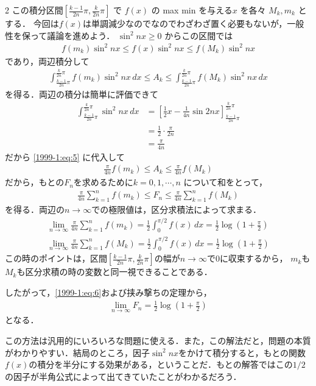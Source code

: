 \documentclass[../../main.tex]{subfiles}
\begin{document}
\begin{multicols}{2}
  この積分区間$\left[ \frac{k-1}{2n}\pi, \frac{k}{2n}\pi \right]$ で $f(x)$ の max min を与える$x$ を各々 $M_k, m_k$ とする．
  今回は$f(x)$は単調減少なのでなのでわざわざ置く必要もないが，一般性を保って議論を進めよう．
  $\sin^2 nx \ge 0$ からこの区間では
  \begin{align*}
    f(m_k) \sin^2 nx \le f(x) \sin^2 nx \le f(M_k) \sin^2 nx
  \end{align*}
  であり，両辺積分して
  \begin{align}
    \int_{\frac{k-1}{2n}\pi}^{\frac{k}{2n}\pi} f(m_k) \sin^2 nx \, dx
    \le A_k
    \le \int_{\frac{k-1}{2n}\pi}^{\frac{k}{2n}\pi} f(M_k) \sin^2 nx \, dx \label{1999-1:eq:5}
  \end{align}
  を得る．両辺の積分は簡単に評価できて
  \begin{align*}
    \int_{\frac{k-1}{2n}\pi}^{\frac{k}{2n}\pi} \sin^2 nx \, dx
     & = \left[ \frac{1}{2}x - \frac{1}{4n}\sin 2nx \right]_{\frac{k-1}{2n}\pi}^{\frac{k}{2n}\pi} \\
     & = \frac{1}{2} \cdot \frac{\pi}{2n}                                                         \\
     & = \frac{\pi}{4n}
  \end{align*}
  だから \cref{1999-1:eq:5} に代入して
  \begin{align*}
    \frac{\pi}{4n} f(m_k) \le A_k \le \frac{\pi}{4n} f(M_k)
  \end{align*}
  だから，もとの$F_n$を求めるために$k=0,1,\cdots,n$ について和をとって，
  \begin{align}
    \frac{\pi}{4n} \sum_{k=1}^{n} f(m_k)
    \le F_n
    \le \frac{\pi}{4n} \sum_{k=1}^{n} f(M_k) \label{1999-1:eq:6}
  \end{align}
  を得る．両辺の$n\to\infty$での極限値は，区分求積法によって求まる．
  \begin{align*}
    \lim_{n\to\infty}\frac{\pi}{4n} \sum_{k=1}^{n} f(m_k) = \frac{1}{2} \int_0^{\pi/2} f(x) \, dx = \frac{1}{2} \log \left(1+\frac{\pi}{2}\right) \\
    \lim_{n\to\infty}\frac{\pi}{4n} \sum_{k=1}^{n} f(M_k) = \frac{1}{2} \int_0^{\pi/2} f(x) \, dx =  \frac{1}{2} \log \left(1+\frac{\pi}{2}\right)
  \end{align*}
  この時のポイントは，区間$\left[ \frac{k-1}{2n}\pi, \frac{k}{2n}\pi \right]$の幅が$n\to\infty$で$0$に収束するから，
  $m_k$も$M_k$も区分求積の時の変数と同一視できることである．

  したがって，\cref{1999-1:eq:6}および挟み撃ちの定理から，
  \begin{align*}
    \lim_{n\to\infty} F_n = \frac{1}{2}\log \left(1+\frac{\pi}{2}\right)
  \end{align*}
  となる．

  この方法は汎用的にいろいろな問題に使える．また，この解法だと，問題の本質がわかりやすい．結局のところ，因子$\sin^2 nx$をかけて積分すると，もとの関数$f(x)$の積分を半分にする効果がある，ということだ．もとの解答ではこの$1/2$の因子が半角公式によって出てきていたことがわかるだろう．
  \newpage
\end{multicols}
\end{document}
